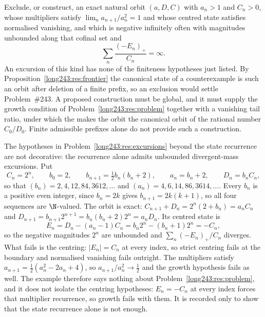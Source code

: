 \begin{problem}\label{long243:res:excursions}
Exclude, or construct, an exact natural orbit $(a,D,C)$ with $a_n>1$ and
$C_n>0$, whose multipliers satisfy $\lim_n a_{n+1}/a_n^{2}=1$ and whose centred
state satisfies normalised vanishing, and which is
negative infinitely often with magnitudes unbounded along that cofinal set and
\[
 \sum_n\frac{(-E_n)_+}{C_n}=\infty .
\]
An excursion of this kind has none of the finiteness hypotheses just listed.
By Proposition~\ref{long243:res:frontier} the canonical state of a counterexample is
such an orbit after deletion of a finite prefix, so an exclusion would settle
Problem~\#243.  A proposed construction must be global, and it must supply the growth
condition of Problem~\ref{long243:res:problem} together with a vanishing tail ratio,
under which the
 makes the orbit the canonical orbit of the rational number
$C_0/D_0$.  Finite admissible prefixes alone do not provide such a
construction.
\end{problem}

\begin{remark}
The hypotheses in Problem~\ref{long243:res:excursions} beyond the state recurrence are
not decorative: the recurrence alone admits unbounded divergent-mass
excursions.  Put
\[
 C_n=2^{n},\qquad b_0=2,\qquad b_{n+1}=\tfrac12 b_n(b_n+2),\qquad
 a_n=b_n+2,\qquad D_n=b_nC_n ,
\]
so that $(b_n)=2,4,12,84,3612,\ldots$ and $(a_n)=4,6,14,86,3614,\ldots$.  Every
$b_n$ is a positive even integer, since $b_n=2k$ gives $b_{n+1}=2k(k+1)$, so all
four sequences are $\N$-valued.  The orbit is exact:
$C_{n+1}+D_n=2^{n}(2+b_n)=a_nC_n$ and
$D_{n+1}=b_{n+1}2^{n+1}=b_n(b_n+2)2^{n}=a_nD_n$.  Its centred state is
\[
 E_n=D_n-(a_n-1)C_n=b_n2^{n}-(b_n+1)2^{n}=-C_n ,
\]
so the negative magnitudes $2^{n}$ are unbounded and $\sum_n(-E_n)_+/C_n$
diverges.  What fails is the centring: $|E_n|=C_n$ at every index, so strict
centring fails at the boundary and normalised vanishing fails outright.  The
multipliers satisfy $a_{n+1}=\tfrac12(a_n^{2}-2a_n+4)$, so
$a_{n+1}/a_n^{2}\to\tfrac12$ and the growth hypothesis fails as well.  The
example therefore says nothing about Problem~\ref{long243:res:problem}, and it does not
isolate the centring hypotheses: $E_n=-C_n$ at every index forces that
multiplier recurrence, so growth fails with them.  It is recorded only to show
that the state recurrence alone is not enough.
\end{remark}


